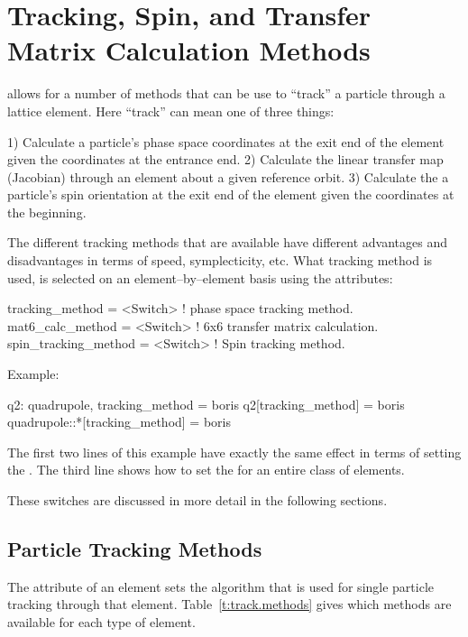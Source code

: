 \chapter{Tracking, Spin, and Transfer Matrix Calculation Methods}
\label{c:methods}

\bmad allows for a number of methods that can be use to ``track'' a particle
through a lattice element. Here ``track'' can mean one of three things:
\begin{example}
  1) Calculate a particle's phase space coordinates at the exit 
     end of the element given the coordinates at the entrance end.
  2) Calculate the linear transfer map (Jacobian) through an element
     about a given reference orbit.
  3) Calculate the a particle's spin orientation at the exit end 
     of the element given the coordinates at the beginning.
\end{example}
The different tracking methods that are available have different
advantages and disadvantages in terms of speed, symplecticity, etc.
What tracking method is used, is selected on an element--by--element
basis using the attributes:
\begin{example}
  tracking_method      = <Switch>   ! phase space tracking method.
  mat6_calc_method     = <Switch>   ! 6x6 transfer matrix calculation.
  spin_tracking_method = <Switch>   ! Spin tracking method.
\end{example}
Example:
\begin{example}
  q2: quadrupole, tracking_method = boris
  q2[tracking_method] = boris
  quadrupole::*[tracking_method] = boris
\end{example}
The first two lines of this example have exactly the same effect in
terms of setting the . The third line shows how to
set the  for an entire class of elements.

These switches are discussed in more detail in the following sections.

\section{Particle Tracking Methods}
\label{s:tkm}

The  attribute of an element sets the algorithm
that is used for single particle tracking through that element.
Table~\ref{t:track.methods} gives which methods are available for each
type of element.

